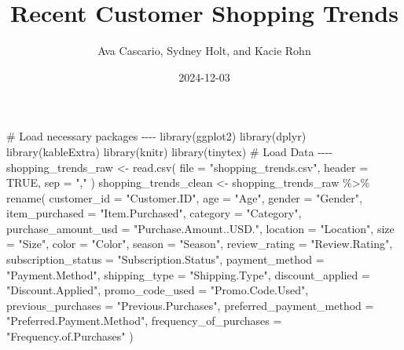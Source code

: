 \documentclass[
  letterpaper,
  DIV=11,
  numbers=noendperiod]{scrartcl}
\title{Recent Customer Shopping Trends}
\author{Ava Cascario, Sydney Holt, and Kacie Rohn}
\date{2024-12-03}
\newenvironment{Shaded}{\begin{snugshade}}{\end{snugshade}}
\newcommand{\AttributeTok}[1]{\textcolor[rgb]{0.40,0.45,0.13}{#1}}
\newcommand{\CommentTok}[1]{\textcolor[rgb]{0.37,0.37,0.37}{#1}}
\newcommand{\ConstantTok}[1]{\textcolor[rgb]{0.56,0.35,0.01}{#1}}
\newcommand{\FunctionTok}[1]{\textcolor[rgb]{0.28,0.35,0.67}{#1}}
\newcommand{\NormalTok}[1]{\textcolor[rgb]{0.00,0.23,0.31}{#1}}
\newcommand{\OtherTok}[1]{\textcolor[rgb]{0.00,0.23,0.31}{#1}}
\newcommand{\SpecialCharTok}[1]{\textcolor[rgb]{0.37,0.37,0.37}{#1}}
\newcommand{\StringTok}[1]{\textcolor[rgb]{0.13,0.47,0.30}{#1}}
\begin{document}
\maketitle

\begin{Shaded}
\begin{Highlighting}[]
\CommentTok{\# Load necessary packages {-}{-}{-}{-}}
\FunctionTok{library}\NormalTok{(ggplot2)}
\FunctionTok{library}\NormalTok{(dplyr)}
\FunctionTok{library}\NormalTok{(kableExtra)}
\FunctionTok{library}\NormalTok{(knitr)}
\FunctionTok{library}\NormalTok{(tinytex)}
\CommentTok{\# Load Data {-}{-}{-}{-}}
\NormalTok{shopping\_trends\_raw }\OtherTok{\textless{}{-}} \FunctionTok{read.csv}\NormalTok{(}
  \AttributeTok{file =} \StringTok{"shopping\_trends.csv"}\NormalTok{, }
  \AttributeTok{header =} \ConstantTok{TRUE}\NormalTok{, }
  \AttributeTok{sep =} \StringTok{","}
\NormalTok{)}
\NormalTok{shopping\_trends\_clean }\OtherTok{\textless{}{-}}\NormalTok{ shopping\_trends\_raw }\SpecialCharTok{\%\textgreater{}\%}
  \FunctionTok{rename}\NormalTok{(}
    \AttributeTok{customer\_id =} \StringTok{"Customer.ID"}\NormalTok{, }
    \AttributeTok{age =} \StringTok{"Age"}\NormalTok{, }
    \AttributeTok{gender =} \StringTok{"Gender"}\NormalTok{, }
    \AttributeTok{item\_purchased =} \StringTok{"Item.Purchased"}\NormalTok{, }
    \AttributeTok{category =} \StringTok{"Category"}\NormalTok{, }
    \AttributeTok{purchase\_amount\_usd =} \StringTok{"Purchase.Amount..USD."}\NormalTok{, }
    \AttributeTok{location =} \StringTok{"Location"}\NormalTok{, }
    \AttributeTok{size =} \StringTok{"Size"}\NormalTok{, }
    \AttributeTok{color =} \StringTok{"Color"}\NormalTok{, }
    \AttributeTok{season =} \StringTok{"Season"}\NormalTok{, }
    \AttributeTok{review\_rating =} \StringTok{"Review.Rating"}\NormalTok{, }
    \AttributeTok{subscription\_status =} \StringTok{"Subscription.Status"}\NormalTok{, }
    \AttributeTok{payment\_method =} \StringTok{"Payment.Method"}\NormalTok{, }
    \AttributeTok{shipping\_type =} \StringTok{"Shipping.Type"}\NormalTok{, }
    \AttributeTok{discount\_applied =} \StringTok{"Discount.Applied"}\NormalTok{, }
    \AttributeTok{promo\_code\_used =} \StringTok{"Promo.Code.Used"}\NormalTok{, }
    \AttributeTok{previous\_purchases =} \StringTok{"Previous.Purchases"}\NormalTok{, }
    \AttributeTok{preferred\_payment\_method =} \StringTok{"Preferred.Payment.Method"}\NormalTok{, }
    \AttributeTok{frequency\_of\_purchases =} \StringTok{"Frequency.of.Purchases"}
\NormalTok{  )}


\end{Highlighting}
\end{Shaded}
\end{document}
